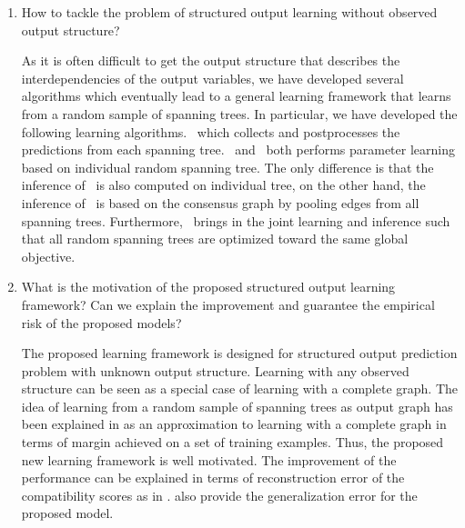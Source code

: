 {\begin{enumerate}[label=\textbf{Q \Roman*}:]
Multi-task structured output prediction problem presented in Section~\ref{sc_multi} requires multiple output variables to be predicted at the same time.
The structured output prediction models are more suitable for the problem as it describes the interdependencies between the output variables and is more efficient compared to the single-task models presented in Section~\ref{sc_single}.
Besides, we have demonstrated the performance of the structured output prediction models in molecular activity prediction problem presented in  and in network influence prediction problem presented in .

\item How to tackle the problem of structured output learning without observed output structure?

As it is often difficult to get the output structure that describes the interdependencies of the output variables, we have developed several algorithms which eventually lead to a general learning framework that learns from a random sample of spanning trees.
In particular, we have developed the following learning algorithms.
\mve\ which collects and postprocesses the predictions from each spanning tree.
\amm\ and \mam\ both performs parameter learning based on individual random spanning tree.
The only difference is that the inference of \amm\ is also computed on individual tree, on the other hand, the inference of \mam\ is based on the consensus graph by pooling edges from all spanning trees.
Furthermore, \rta\ brings in the joint learning and inference such that all random spanning trees are optimized toward the same global objective.

\item What is the motivation of the proposed structured output learning framework? Can we explain the improvement and guarantee the empirical risk of the proposed models?

The proposed learning framework is designed for structured output prediction problem with unknown output structure.
Learning with any observed structure can be seen as a special case of learning with a complete graph.
The idea of learning from a random sample of spanning trees as output graph has been explained in  as an approximation to learning with a complete graph in terms of margin achieved on a set of training examples.
Thus, the proposed new learning framework is well motivated.
The improvement of the performance can be explained in terms of reconstruction error of the compatibility scores as in .
 also provide the generalization error for the proposed model.


\end{enumerate}}
